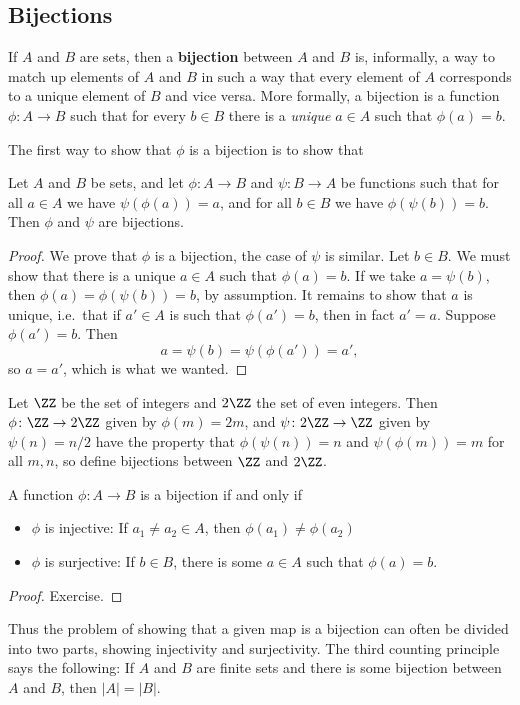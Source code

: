 \documentclass{amsart}
\begin{document}
\subsection{Bijections}
If $A$ and $B$ are sets, then a \textbf{bijection} between $A$ and $B$ is, informally, a way to match up elements of $A$ and $B$ in such a way that every element of $A$ corresponds to a unique element of $B$ and vice versa.
More formally, a bijection is a function $\phi \colon A \to B$ such that for every $b \in B$ there is a \textit{unique} $a \in A$ such that $\phi(a) = b$.

The first way to show that $\phi$ is a bijection is to show that 
\begin{nlemma}
	Let $A$ and $B$ be sets, and let $\phi \colon A \to B$ and $\psi \colon B \to A$ be functions such that for all $a \in A$ we have $\psi(\phi(a)) = a$, and for all $b \in B$ we have $\phi(\psi(b)) = b$.
	Then $\phi$ and $\psi$ are bijections.
\end{nlemma}
\begin{proof}
	We prove that $\phi$ is a bijection, the case of $\psi$ is similar.
	Let $b \in B$.
	We must show that there is a unique $a \in A$ such that $\phi(a) = b$.
	If we take $a = \psi(b)$, then $\phi(a) = \phi(\psi(b)) = b$, by assumption.
	It remains to show that $a$ is unique, i.e.~that if $a'\in A$ is such that $\phi(a') = b$, then in fact $a' = a$.
	Suppose $\phi(a') = b$.
	Then
	\[
	a = \psi(b) = \psi(\phi(a')) = a',
	\]
	so $a = a'$, which is what we wanted.
\end{proof}

\begin{nex}
	Let $\ZZ$ be the set of integers and $2\ZZ$ the set of even integers.
	Then $\phi \colon \ZZ \to 2\ZZ$ given by $\phi(m) = 2m$, and $\psi \colon 2\ZZ \to \ZZ$ given by $\psi(n) = n/2$ have the property that $\phi(\psi(n)) = n$ and $\psi(\phi(m)) = m$ for all $m,n$, so define bijections between $\ZZ$ and $2\ZZ$.
\end{nex}

\begin{nlemma}
	A function $\phi \colon A \to B$ is a bijection if and only if
	\begin{itemize}
		\item $\phi$ is injective: If $a_1 \not= a_2 \in A$, then $\phi(a_1) \not= \phi(a_2)$
		\item $\phi$ is surjective: If $b \in B$, there is some $a \in A$ such that $\phi(a) = b$.
	\end{itemize}
\end{nlemma}
\begin{proof}
	Exercise.
\end{proof}
Thus the problem of showing that a given map is a bijection can often be divided into two parts, showing injectivity and surjectivity.
The third counting principle says the following: If $A$ and $B$ are finite sets and there is some bijection between $A$ and $B$, then $|A| = |B|$.
\end{document}
